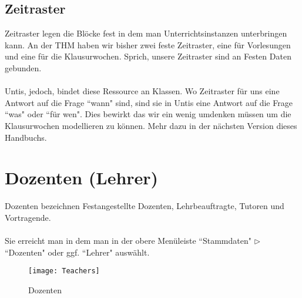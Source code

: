 \documentclass[]{report}
\begin{document}
\subsection{Zeitraster}

Zeitraster legen die Blöcke fest in dem man Unterrichtsinstanzen unterbringen kann. An der THM haben wir bisher zwei feste Zeitraster, eine für Vorlesungen und eine für die Klausurwochen. Sprich, unsere Zeitraster sind an Festen Daten gebunden.\\
\\
Untis, jedoch, bindet diese Ressource an Klassen. Wo Zeitraster für uns eine Antwort auf die Frage ``wann" sind, sind sie in Untis eine Antwort auf die Frage ``was" oder ``für wen". Dies bewirkt das wir ein wenig umdenken müssen um die Klausurwochen modellieren zu können. Mehr dazu in der nächsten Version dieses Handbuchs.

\newpage
\section{Dozenten (Lehrer)}

Dozenten bezeichnen Festangestellte Dozenten, Lehrbeauftragte, Tutoren und Vortragende.\\
\\
Sie erreicht man in dem man in der obere Menüleiste ``Stammdaten" $\triangleright$ ``Dozenten" oder ggf. ``Lehrer" auswählt.

\begin{figure}[h]
	\texttt{[image: Teachers]}
	\vspace{-15pt}
	\caption{Dozenten}
	\label{fig:teachers}
\end{figure}
\end{document}

